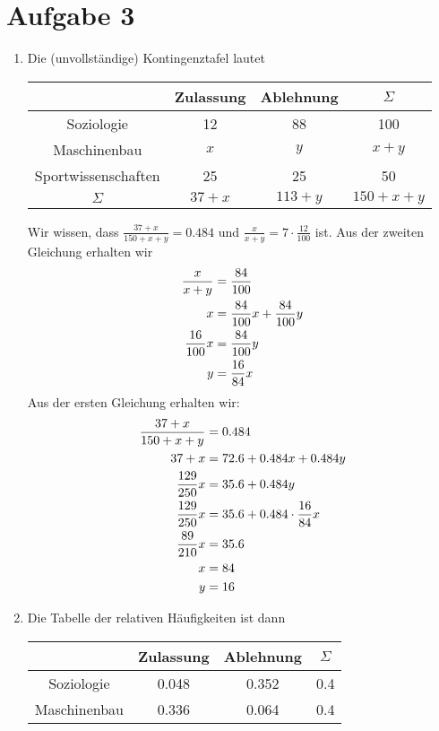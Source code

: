 \documentclass{article}
\begin{document}
	\section*{Aufgabe 3}
	\begin{enumerate}[label=(\alph*)]
		\item Die (unvollständige) Kontingenztafel lautet
		\begin{center}
			\begin{tabular}{c|cc|c}
				& Zulassung & Ablehnung & $\Sigma$ \\
				\hline
				Soziologie & 12 & 88 & 100 \\
				Maschinenbau & $x$ & $y$ & $x+y$ \\
				Sportwissenschaften & 25 & 25 & 50 \\
				\hline
				$\Sigma$ & $37+x$ & $113+y$ & $150+x+y$
			\end{tabular}
		\end{center}
		Wir wissen, dass $\frac{37+x}{150+x+y}=0.484$ und $\frac{x}{x+y}=7\cdot\frac{12}{100}$ ist. Aus der zweiten Gleichung erhalten wir
		\begin{align}
			\frac{x}{x+y} &= \frac{84}{100} \notag \\
			x &= \frac{84}{100}x + \frac{84}{100}y \notag \\
			\frac{16}{100}x &= \frac{84}{100}y \notag \\
			y &= \frac{16}{84}x \notag
		\end{align}
		Aus der ersten Gleichung erhalten wir:
		\begin{align}
			\frac{37+x}{150+x+y} &= 0.484 \notag \\
			37+x &= 72.6 + 0.484x + 0.484y \notag \\
			\frac{129}{250}x &= 35.6 + 0.484y \notag \\
			\frac{129}{250}x &= 35.6 + 0.484\cdot\frac{16}{84}x \notag \\
			\frac{89}{210}x &= 35.6 \notag \\
			x &= 84 \notag \\
			y &= 16 \notag \notag
		\end{align}
		\item Die Tabelle der relativen Häufigkeiten ist dann
		\begin{center}
			\begin{tabular}{c|cc|c}
				& Zulassung & Ablehnung & $\Sigma$ \\
				\hline
				Soziologie & 0.048 & 0.352 & 0.4 \\
				Maschinenbau & 0.336 & 0.064 & 0.4 \\

\end{tabular}
\end{center}
\end{enumerate}
\end{document}
